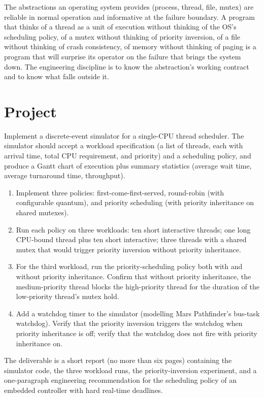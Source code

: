 \begin{principle}
The abstractions an operating system provides (process, thread, file, mutex) are reliable in normal operation and informative at the failure boundary. A program that thinks of a thread as a unit of execution without thinking of the OS's scheduling policy, of a mutex without thinking of priority inversion, of a file without thinking of crash consistency, of memory without thinking of paging is a program that will surprise its operator on the failure that brings the system down. The engineering discipline is to know the abstraction's working contract and to know what falls outside it.
\end{principle}

\section{Project}

\begin{project}
Implement a discrete-event simulator for a single-CPU thread scheduler. The simulator should accept a workload specification (a list of threads, each with arrival time, total CPU requirement, and priority) and a scheduling policy, and produce a Gantt chart of execution plus summary statistics (average wait time, average turnaround time, throughput).

\begin{enumerate}[leftmargin=*]
  \item Implement three policies: first-come-first-served, round-robin (with configurable quantum), and priority scheduling (with priority inheritance on shared mutexes).
  \item Run each policy on three workloads: ten short interactive threads; one long CPU-bound thread plus ten short interactive; three threads with a shared mutex that would trigger priority inversion without priority inheritance.
  \item For the third workload, run the priority-scheduling policy both with and without priority inheritance. Confirm that without priority inheritance, the medium-priority thread blocks the high-priority thread for the duration of the low-priority thread's mutex hold.
  \item Add a watchdog timer to the simulator (modelling Mars Pathfinder's bus-task watchdog). Verify that the priority inversion triggers the watchdog when priority inheritance is off; verify that the watchdog does not fire with priority inheritance on.
\end{enumerate}

The deliverable is a short report (no more than six pages) containing the simulator code, the three workload runs, the priority-inversion experiment, and a one-paragraph engineering recommendation for the scheduling policy of an embedded controller with hard real-time deadlines.
\end{project}

